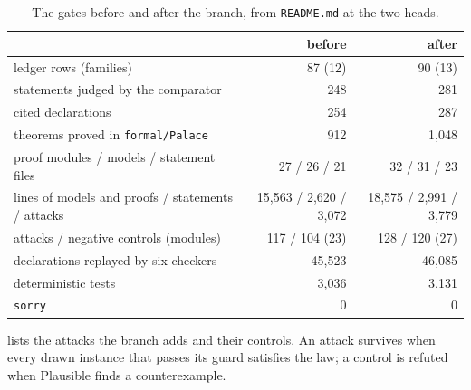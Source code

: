 \documentclass[11pt]{article}
\theoremstyle{plain}
\theoremstyle{definition}
\theoremstyle{remark}
\begin{document}
\begin{table}[htbp]
\centering\footnotesize
\caption{The gates before and after the branch, from \texttt{README.md} at the two heads.}\label{tab:gates}
\begin{tabular}{lrr}
\toprule
 & before & after \\
\midrule
ledger rows (families) & 87 (12) & 90 (13) \\
statements judged by the comparator & 248 & 281 \\
cited declarations & 254 & 287 \\
theorems proved in \texttt{formal/Palace} & 912 & 1,048 \\
proof modules / models / statement files & 27 / 26 / 21 & 32 / 31 / 23 \\
lines of models and proofs / statements / attacks & 15,563 / 2,620 / 3,072 & 18,575 / 2,991 / 3,779 \\
attacks / negative controls (modules) & 117 / 104 (23) & 128 / 120 (27) \\
declarations replayed by six checkers & 45,523 & 46,085 \\
deterministic tests & 3,036 & 3,131 \\
\texttt{sorry} & 0 & 0 \\
\bottomrule
\end{tabular}
\end{table}

 lists the attacks the branch adds and their controls. An attack survives when
every drawn instance that passes its guard satisfies the law; a control is refuted when Plausible
finds a counterexample.
\end{document}
